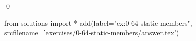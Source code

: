 
\begin{ex}
  \label{ex:0-64-static-members}
  
  \qed
\end{ex}
\begin{python0}
from solutions import *
add(label="ex:0-64-static-members",
    srcfilename='exercises/0-64-static-members/answer.tex')
\end{python0}
